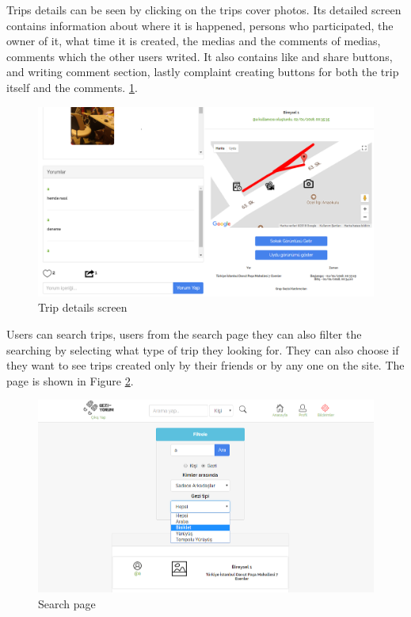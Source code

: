 \newpage

Trips details can be seen by clicking on the trips cover photos. Its detailed screen contains information about where it is happened, persons who participated, the owner of it, what time it is created, the medias and the comments of medias, comments which the other users writed. It also contains like and share buttons, and writing comment section, lastly complaint creating buttons for both the trip itself and the comments. 
\ref{fig:tripDetail}. 

\begin{figure}[!htbp]
\centering
\includegraphics[width=\textwidth]{projectChapters/images/tripDetail.png}
\caption{Trip details screen}
\label{fig:tripDetail}
\end{figure}

\newpage

Users can search trips, users from the search page they can also filter the searching by selecting what type of trip they looking for. They can also choose if they want to see trips   created only by their friends or by any one on the site. The page is shown in Figure   \ref{fig:searchPageWeb}.

\begin{figure}[!htbp]
\centering
\includegraphics[width=\textwidth]{projectChapters/images/searchPageWeb.png}
\caption{Search page}
\label{fig:searchPageWeb}
\end{figure}

